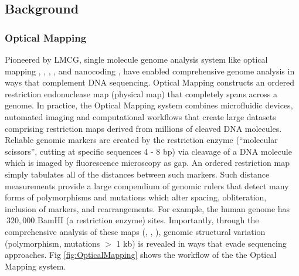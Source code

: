 
\subsection{Background}
\subsubsection*{Optical Mapping}
Pioneered by LMCG, single molecule genome analysis system like optical mapping \cite{Schwartz_etal_1993_Science}, \cite{Dimalanta_etal_2004_AnalChem}, \cite{Aston_etal_1999_Optical}, \cite{Teague_etal_2010_PNAS}, \cite{Yokota_etal_1997_NAR} and nanocoding \cite{Jo_etal_2007_PNAS}, \cite{Chen_etal_2005_Macromolecules} have enabled comprehensive genome analysis in ways that
complement DNA sequencing. Optical Mapping constructs an ordered restriction endonuclease map (physical map) that completely spans across a genome. In practice, the Optical Mapping system combines microfluidic devices, automated imaging and computational workflows that create large datasets comprising restriction maps derived from millions of cleaved DNA molecules. Reliable genomic markers are created by the restriction enzyme (``molecular scissors'', cutting at specific sequences 4 - 8 bp) via cleavage of a DNA molecule which is imaged by fluorescence microscopy as gap. An ordered restriction map simply tabulates all of the distances between such markers. Such distance measurements provide a large compendium of genomic rulers that detect many forms of polymorphisms and mutations which alter spacing, obliteration, inclusion of markers, and rearrangements. For example, the human genome has $~320,000$ BamHI (a restriction enzyme) sites. Importantly, through the comprehensive analysis of these maps (\cite{Gupta_etal_2015_PNAS}, \cite{Ray_etal_2013_BMCGenomics}, \cite{Teague_etal_2010_PNAS}), genomic structural variation (polymorphism, mutations $>$ 1 kb) is revealed in ways that evade sequencing approaches. Fig \ref{fig:OpticalMapping} shows the workflow of the the Optical Mapping system.


